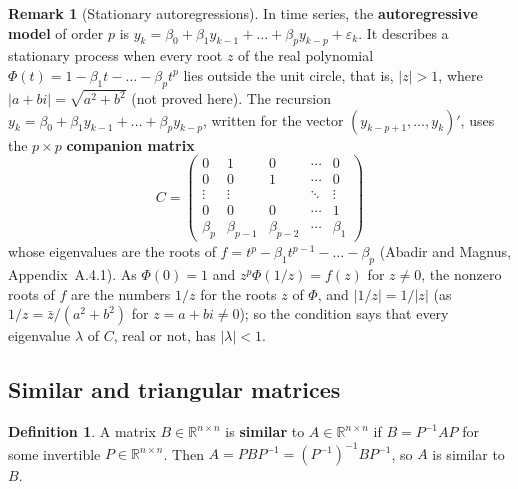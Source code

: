 \documentclass[12pt]{article}
\newcommand{\R}{\mathbb R}
\theoremstyle{definition}
\newtheorem{definition}[theorem]{Definition}
\newtheorem{remark}[theorem]{Remark}
\begin{document}
\begin{remark}[Stationary autoregressions]\label{r7-rem-ar}
In time series, the \textbf{autoregressive model} of order \(p\) is
\(y_k=\beta_0+\beta_1y_{k-1}+\dots+\beta_py_{k-p}+\varepsilon_k\). It describes a stationary process when every root
\(z\) of the real polynomial \(\Phi(t)=1-\beta_1t-\dots-\beta_pt^p\) lies outside the unit circle, that is,
\(\lvert z\rvert>1\), where \(\lvert a+bi\rvert=\sqrt{a^2+b^2}\) (not proved
here). The recursion \(y_k=\beta_0+\beta_1y_{k-1}+\dots+\beta_py_{k-p}\), written for the vector
\((y_{k-p+1},\dots,y_k)'\), uses the \(p\times p\) \textbf{companion matrix}
\[
C=\begin{pmatrix}0&1&0&\cdots&0\\0&0&1&\cdots&0\\\vdots&\vdots&&\ddots&\vdots\\0&0&0&\cdots&1\\
\beta_p&\beta_{p-1}&\beta_{p-2}&\cdots&\beta_1\end{pmatrix}
\]
whose eigenvalues are the roots of \(f=t^p-\beta_1t^{p-1}-\dots-\beta_p\) (Abadir and Magnus, Appendix~A.4.1). As
\(\Phi(0)=1\) and \(z^p\Phi(1/z)=f(z)\) for \(z\ne0\), the nonzero roots of \(f\) are the numbers \(1/z\) for the roots
\(z\) of \(\Phi\), and \(\lvert1/z\rvert=1/\lvert z\rvert\) (as \(1/z=\bar z/(a^2+b^2)\) for \(z=a+bi\ne0\)); so the condition says that every eigenvalue \(\lambda\) of \(C\), real or not, has
\(\lvert\lambda\rvert<1\).
\end{remark}

\subsection*{Similar and triangular matrices}

\begin{definition}\label{r7-def-similar}
A matrix \(B\in\R^{n\times n}\) is \textbf{similar} to \(A\in\R^{n\times n}\) if \(B=P^{-1}AP\) for some invertible
\(P\in\R^{n\times n}\). Then \(A=PBP^{-1}=(P^{-1})^{-1}BP^{-1}\), so \(A\) is similar to \(B\).
\end{definition}
\end{document}

